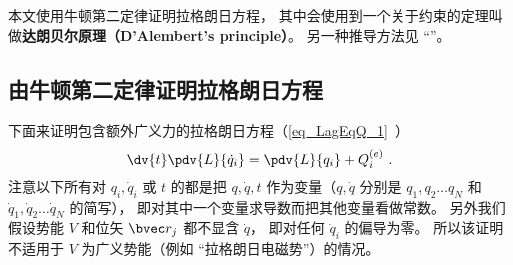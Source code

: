 

本文使用牛顿第二定律证明拉格朗日方程， 其中会使用到一个关于约束的定理叫做\textbf{达朗贝尔原理（D'Alembert's principle）}。 另一种推导方法见 “”。

\subsection{由牛顿第二定律证明拉格朗日方程}
下面来证明包含额外广义力的拉格朗日方程（\autoref{eq_LagEqQ_1}~）
\begin{equation}
\dv{t} \pdv{L}{\dot q_i} = \pdv{L}{q_i} + Q_i^{(e)}~.
\end{equation}
注意以下所有对 $q_i, \dot q_i$ 或 $t$ 的都是把 $q, \dot q, t$ 作为变量（$q, \dot q$ 分别是 $q_1, q_2\dots q_N$ 和 $\dot q_1, \dot q_2\dots \dot q_N$ 的简写）， 即对其中一个变量求导数而把其他变量看做常数。 另外我们假设势能 $V$ 和位矢 $\bvec r_j$ 都不显含 $\dot q$， 即对任何 $\dot q_i$ 的偏导为零。 所以该证明不适用于 $V$ 为广义势能（例如 “拉格朗日电磁势”）的情况。

